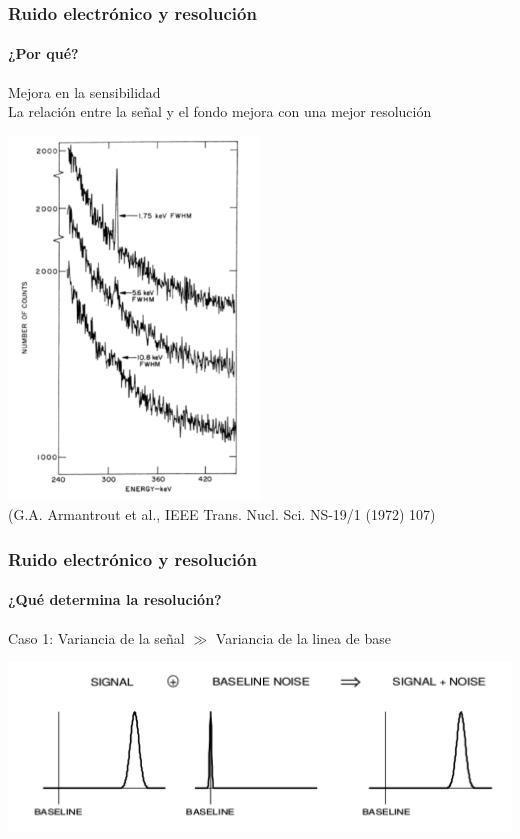 \documentclass{beamer}
\begin{document}
\begin{frame}
\frametitle{Ruido electrónico y resolución}
\framesubtitle{¿Por qué?}
{\color{blue}Mejora en la sensibilidad} \\
\small{La relación entre la señal y el fondo mejora con una mejor resolución}
\begin{center}
\includegraphics[height=0.68\textheight,width=0.5\textwidth]{d1/improved_sensitivity} \\
\tiny{(G.A. Armantrout et al., IEEE Trans. Nucl. Sci. NS-19/1 (1972) 107)}
\end{center}
\end{frame} 

\begin{frame}
\frametitle{Ruido electrónico y resolución}
\framesubtitle{¿Qué determina la resolución?}
{\color{blue}Caso 1: Variancia de la señal $\gg$ Variancia de la linea de base} 
\begin{center}
\includegraphics[height=0.5\textheight,width=\textwidth]{d1/signal_mayor_baseline} 
\end{center}
\end{frame} 
\end{document}
